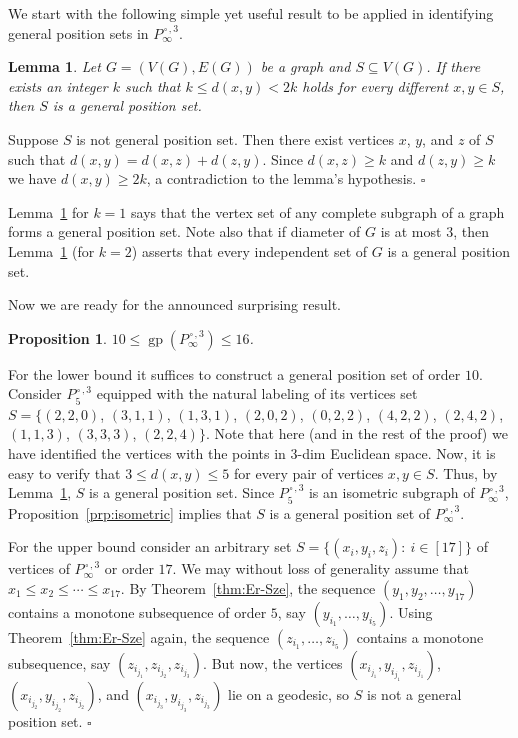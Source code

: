 \documentclass[12pt]{article}
\newtheorem{proposition}[theorem]{Proposition}
\newtheorem{lemma}[theorem]{Lemma}
\newcommand{\proof}{\noindent{\bf Proof.\ }}
\newcommand{\qed}{\hfill $\square$\medskip}
\def\cp{\,\square\,}
\DeclareMathOperator {\gp} {gp}
\begin{document}
We start with the following simple yet useful result to be applied in identifying general position sets in $P_{\infty}^{\cp,3}$.  

\begin{lemma}
	\label{lem:LGPCOND}
	Let $G=(V(G),E(G))$ be a graph and $S\subseteq V(G)$. If there exists an integer $k$ such that $k \leq d(x,y) < 2k$ holds for every different $x,y\in S$, then $S$ is a general position set.  
\end{lemma}

\proof
Suppose $S$ is not general position set. Then there exist vertices $x$, $y$, and $z$ of $S$ such that $d(x,y) = d(x,z) + d(z,y)$. Since $d(x,z)\ge k$ and $d(z,y)\ge k$ we have $d(x,y)\geq 2k$, a contradiction to the lemma's hypothesis. 
\qed

Lemma~\ref{lem:LGPCOND} for $k=1$ says that the vertex set of any complete subgraph of a graph forms a general position set. Note also that if diameter of $G$ is at most $3$, then Lemma~\ref{lem:LGPCOND} (for $k=2$) asserts that every independent set of $G$ is a general position set.  

Now we are ready for the announced surprising result. 

\begin{proposition}
\label{prp:T3DGRID}
$10\le \gp(P_{\infty}^{\cp,3}) \le 16$. 
\end{proposition} 

\proof 
For the lower bound it suffices to construct a general position set of order $10$. Consider $P_{5}^{\cp,3}$ equipped with the natural labeling of its vertices set $S = \{(2,2,0)$, $(3,1,1)$, $(1,3,1)$, $(2,0,2)$, $(0,2,2)$, $(4,2,2)$, $(2,4,2)$, $(1,1,3)$, $(3,3,3)$, $(2,2,4)\}$. Note that here (and in the rest of the proof) we have identified the vertices with the points in $3$-dim Euclidean space. Now, it is easy to verify that $3 \leq d(x,y) \leq 5$ for every pair of vertices  $x, y \in S$. Thus, by Lemma~\ref{lem:LGPCOND}, $S$ is a general position set. Since $P_{5}^{\cp,3}$ is an isometric subgraph of $P_{\infty}^{\cp,3}$, Proposition~\ref{prp:isometric} implies that $S$ is a general position set of $P_{\infty}^{\cp,3}$. 

For the upper bound consider an arbitrary set $S = \{(x_i,y_i,z_i):\ i\in [17]\}$ of vertices of $P_{\infty}^{\cp,3}$ or order $17$. We may without loss of generality assume that $x_1\le x_2\le\cdots \le x_{17}$. By Theorem~\ref{thm:Er-Sze}, the sequence $(y_1, y_2, \ldots, y_{17})$ contains a monotone subsequence of order $5$, say $(y_{i_1}, \ldots, y_{i_5})$. Using Theorem~\ref{thm:Er-Sze} again, the sequence $(z_{i_1}, \ldots, z_{i_5})$ contains a monotone subsequence, say $(z_{i_{j_1}}, z_{i_{j_2}}, z_{i_{j_3}})$. But now, the vertices $(x_{i_{j_1}}, y_{i_{j_1}}, z_{i_{j_1}})$, $(x_{i_{j_2}}, y_{i_{j_2}}, z_{i_{j_2}})$, and $(x_{i_{j_3}},y_{i_{j_3}},z_{i_{j_3}})$ lie on a geodesic, so $S$ is not a general position set.
\qed
\end{document}
